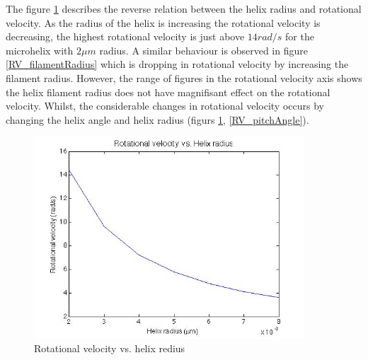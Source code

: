 \documentclass[12pt,a4paper,titlepage]{report}
\begin{document}
The figure \ref{RV_helixRadius1} describes the reverse relation between the helix radius and rotational
velocity. As the radius of the helix is increasing the rotational velocity is decreasing, the highest rotational
velocity is just above $14 rad/s$ for the microhelix with $2 \mu m$ radius. A similar behaviour is observed
in figure \ref{RV_filamentRadius} which is dropping in rotational velocity by increasing the filament radius.
However, the range of figures in the rotational velocity axis shows the helix filament radius does not have
magnifisant effect on the rotational velocity. Whilst, the considerable changes in rotational velocity occurs
by changing the helix angle and helix radius (figurs \ref{RV_helixRadius1}, \ref{RV_pitchAngle}). 




\begin{figure}
  \centering
    \includegraphics[width=0.90\textwidth]{RV_helixRadius1}
  \caption[Rotational velocity vs. helix rediu]{Rotational velocity vs. helix redius }
  \label{RV_helixRadius1}
\end{figure}
\end{document}
